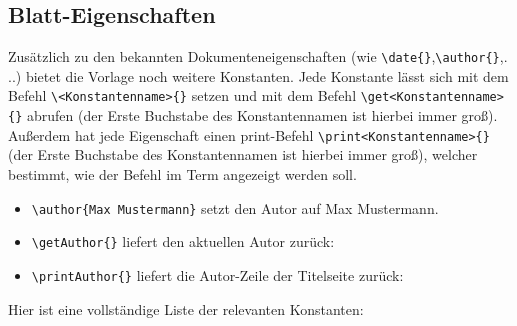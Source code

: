 \documentclass[
    titleprefix=AlgoTeX,
    inlineshortcut=java,
    corporatedesign,
    boxarc,
]{algoexercise}
\renewcommand*{\author}[1]{
    \seq_gset_split:Nnn \g_ptxcd_author_seq {\and} {#1}
    \seq_if_empty:NF \g_ptxcd_author_seq {\tl_gset:Nn \printAuthor {\int_compare:nTF{\seq_count:N \g_ptxcd_author_seq >
                1}{Autoren}{Autor}:~\hfill\seq_use:Nnnn \g_ptxcd_author_seq {~\authorandname{}~} {,~} {~\authorandname{}~}\par}}
}
\begin{document}
    \subsection{Blatt-Eigenschaften}\label{sheet-properties}
    Zusätzlich zu den bekannten Dokumenteneigenschaften (wie \verb+\date{}+,\verb+\author{}+,.
    ..) bietet die Vorlage noch weitere
    Konstanten.
    Jede Konstante lässt sich mit dem Befehl \verb+\<Konstantenname>{}+ setzen und mit dem Befehl \verb+\get<Konstantenname>{}+
    abrufen (der Erste Buchstabe des Konstantennamen ist hierbei immer groß).
    Außerdem hat jede Eigenschaft einen print-Befehl \verb+\print<Konstantenname>{}+ (der Erste Buchstabe des Konstantennamen ist
    hierbei immer groß), welcher bestimmt, wie der Befehl im Term angezeigt werden soll.
    \begin{beispiel}
        \begin{itemize}
            \item \verb+\author{Max Mustermann}+ setzt den Autor auf Max Mustermann.
            \item \verb+\getAuthor{}+ liefert den aktuellen Autor zurück: \getAuthor{}
            \item \verb+\printAuthor{}+ liefert die Autor-Zeile der Titelseite zurück:\par\printAuthor{}
        \end{itemize}
    \end{beispiel}
    Hier ist eine vollständige Liste der relevanten Konstanten:
\end{document}
